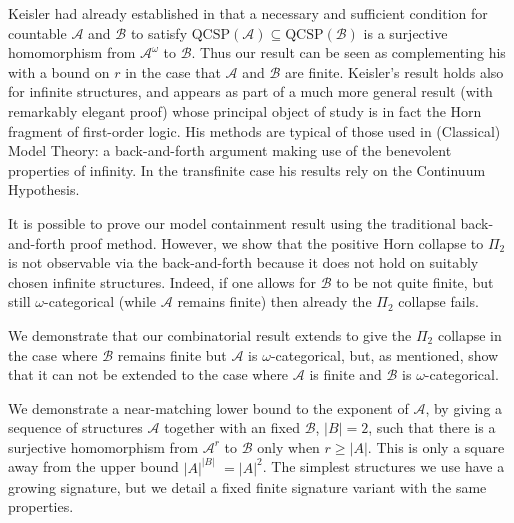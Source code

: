\documentclass{LMCS}
\begin{document}
Keisler had already established in \cite{Keisler65} that a necessary and sufficient condition for countable $\mathcal{A}$ and $\mathcal{B}$ to satisfy  $\mathrm{QCSP}(\mathcal{A}) \subseteq \mathrm{QCSP}(\mathcal{B})$ is a surjective homomorphism from $\mathcal{A}^\omega$ to $\mathcal{B}$. Thus our result can be seen as complementing his with a bound on $r$ in the case that $\mathcal{A}$ and $\mathcal{B}$ are finite. Keisler's result holds also for infinite structures, and appears as part of a much more general result (with remarkably elegant proof) whose principal object of study is in fact the Horn fragment of first-order logic. His methods are typical of those used in (Classical) Model Theory: a back-and-forth argument making use of the benevolent properties of infinity. In the transfinite case his results rely on the Continuum Hypothesis.  

It is possible to prove our model containment result using the traditional back-and-forth proof method. However, we show that the positive Horn collapse to $\Pi_2$ is not observable via the back-and-forth because it does not hold on suitably chosen infinite structures. Indeed, if one allows for $\mathcal{B}$ to be not quite finite, but still $\omega$-categorical (while $\mathcal{A}$ remains finite) then already the $\Pi_2$ collapse fails.


We demonstrate that our combinatorial result extends to give the $\Pi_2$ collapse in the case where $\mathcal{B}$ remains finite but $\mathcal{A}$ is $\omega$-categorical, but, as mentioned, show that it can not be extended to the case where $\mathcal{A}$ is finite and $\mathcal{B}$ is $\omega$-categorical. 

We demonstrate a near-matching lower bound to the exponent of $\mathcal{A}$, by giving a sequence of structures $\mathcal{A}$ together with an fixed $\mathcal{B}$, $|B|=2$, such that there is a surjective homomorphism from $\mathcal{A}^r$ to $\mathcal{B}$ only when $r \geq |A|$. This is only a square away from the upper bound $|A|^{|B|}$ $=|A|^2$. The simplest structures we use have a growing signature, but we detail a fixed finite signature variant with the same properties.
\end{document}
